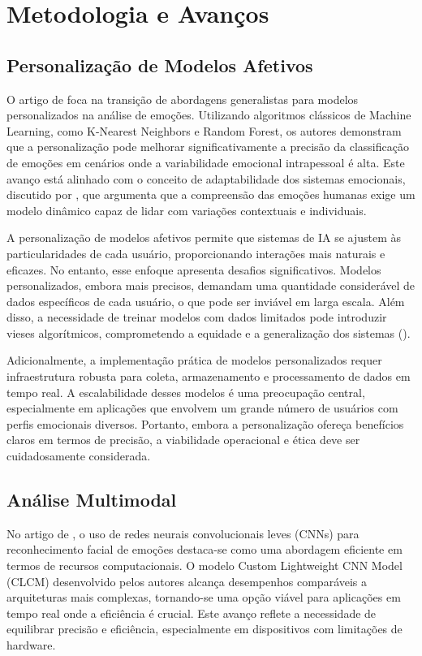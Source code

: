 \documentclass[a4paper,12pt]{report}
\begin{document}
	
	\section{Metodologia e Avanços}
	
	\subsection{Personalização de Modelos Afetivos}
	
	O artigo de \textcite{kargarandehkordi2024} foca na transição de abordagens generalistas para modelos personalizados na análise de emoções. Utilizando algoritmos clássicos de Machine Learning, como K-Nearest Neighbors e Random Forest, os autores demonstram que a personalização pode melhorar significativamente a precisão da classificação de emoções em cenários onde a variabilidade emocional intrapessoal é alta. Este avanço está alinhado com o conceito de adaptabilidade dos sistemas emocionais, discutido por \textcite{picard1997}, que argumenta que a compreensão das emoções humanas exige um modelo dinâmico capaz de lidar com variações contextuais e individuais.
	
	A personalização de modelos afetivos permite que sistemas de IA se ajustem às particularidades de cada usuário, proporcionando interações mais naturais e eficazes. No entanto, esse enfoque apresenta desafios significativos. Modelos personalizados, embora mais precisos, demandam uma quantidade considerável de dados específicos de cada usuário, o que pode ser inviável em larga escala. Além disso, a necessidade de treinar modelos com dados limitados pode introduzir vieses algorítmicos, comprometendo a equidade e a generalização dos sistemas (\textcite{mueller2020}).
	
	Adicionalmente, a implementação prática de modelos personalizados requer infraestrutura robusta para coleta, armazenamento e processamento de dados em tempo real. A escalabilidade desses modelos é uma preocupação central, especialmente em aplicações que envolvem um grande número de usuários com perfis emocionais diversos. Portanto, embora a personalização ofereça benefícios claros em termos de precisão, a viabilidade operacional e ética deve ser cuidadosamente considerada.
	
	
	\subsection{Análise Multimodal}
	
	No artigo de \textcite{gursesli2024}, o uso de redes neurais convolucionais leves (CNNs) para reconhecimento facial de emoções destaca-se como uma abordagem eficiente em termos de recursos computacionais. O modelo Custom Lightweight CNN Model (CLCM) desenvolvido pelos autores alcança desempenhos comparáveis a arquiteturas mais complexas, tornando-se uma opção viável para aplicações em tempo real onde a eficiência é crucial. Este avanço reflete a necessidade de equilibrar precisão e eficiência, especialmente em dispositivos com limitações de hardware.
	
\end{document}
